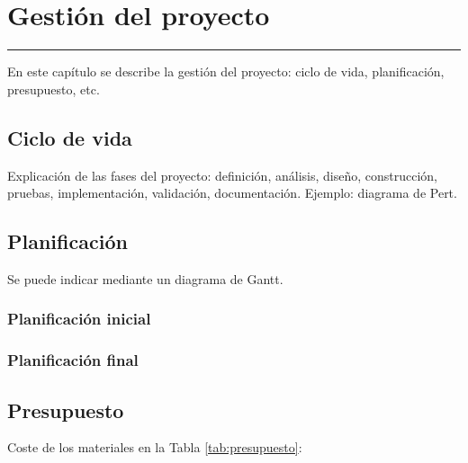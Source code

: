 \chapter{Gestión del proyecto} \label{chap:Gestion}
\hrule
\vspace{3mm}

En este capítulo se describe la gestión del proyecto: ciclo de vida, planificación, presupuesto, etc.

\section{Ciclo de vida}

Explicación de las fases del proyecto: definición, análisis, diseño, construcción, pruebas, implementación, validación, documentación. Ejemplo: diagrama de Pert.

\section{Planificación}

Se puede indicar mediante un diagrama de Gantt.

\subsection{Planificación inicial}

\subsection{Planificación final}


\section{Presupuesto}

    Coste de los materiales en la Tabla \ref{tab:presupuesto}: 
    
    \completar
    
    \renewcommand{\thempfootnote}{\arabic{mpfootnote}}
    
